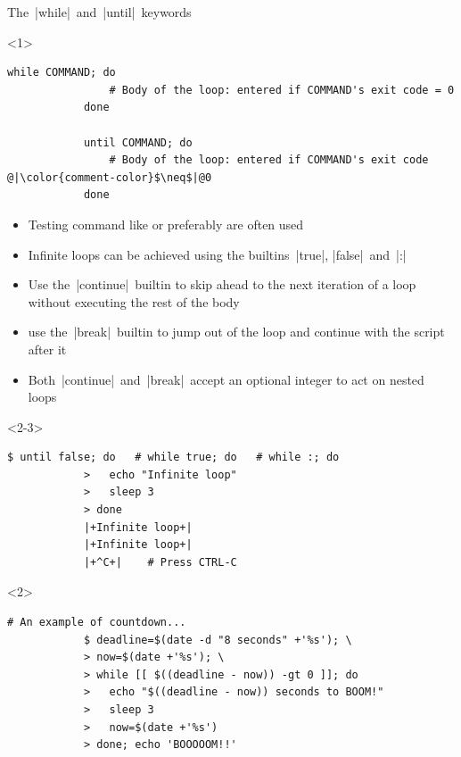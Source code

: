 \begin{frame}[fragile]{The \,\bash|while|\, and \,\bash|until|\, keywords}
    \begin{onlyenv}<1>
        \begin{lstlisting}[style=MyBash, numbers=none]
            while COMMAND; do
                # Body of the loop: entered if COMMAND's exit code = 0
            done

            until COMMAND; do
                # Body of the loop: entered if COMMAND's exit code @|\color{comment-color}$\neq$|@0
            done
        \end{lstlisting}
        \bigskip
        \begin{itemize}
            \item Testing command like \bash{[} or preferably \bash{[[} are often used
            \item Infinite loops can be achieved using the builtins \,\bash|true|, \bash|false|\, and \,\bash|:|
            \item Use the \,\bash|continue|\, builtin to skip ahead to the next iteration of a loop without executing the rest of the body
            \item use the \,\bash|break|\, builtin to jump out of the loop and continue with the script after it
            \item Both \,\bash|continue|\, and \,\bash|break|\, accept an optional integer to act on nested loops
        \end{itemize}
    \end{onlyenv}
    \begin{onlyenv}<2-3>
        \begin{lstlisting}[style=MyBash]
            $ until false; do   # while true; do   # while :; do
            >   echo "Infinite loop"
            >   sleep 3
            > done
            |+Infinite loop+|
            |+Infinite loop+|
            |+^C+|    # Press CTRL-C
        \end{lstlisting}
        \medskip
    \end{onlyenv}
    \begin{onlyenv}<2>
        \begin{lstlisting}[style=MyBash]
            # An example of countdown...
            $ deadline=$(date -d "8 seconds" +'%s'); \
            > now=$(date +'%s'); \
            > while [[ $((deadline - now)) -gt 0 ]]; do
            >   echo "$((deadline - now)) seconds to BOOM!"
            >   sleep 3
            >   now=$(date +'%s')
            > done; echo 'BOOOOOM!!'

\end{lstlisting}
\end{onlyenv}
\end{frame}
